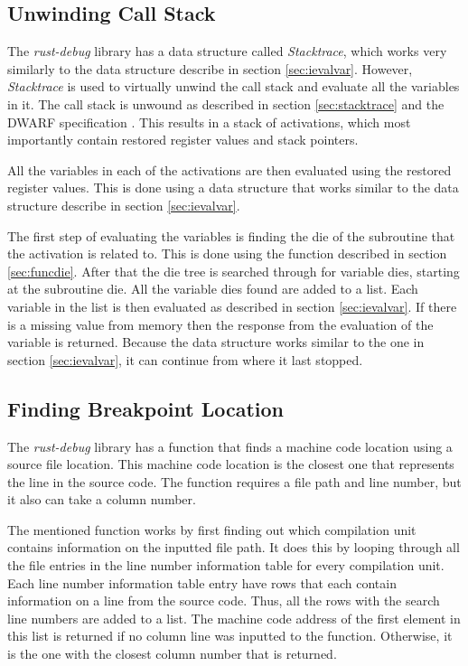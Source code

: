 \subsection{Unwinding Call Stack}
The \emph{rust-debug} library has a data structure called \emph{Stacktrace}, which works very similarly to the data structure describe in section \ref{sec:ievalvar}.
However, \emph{Stacktrace} is used to virtually unwind the call stack and evaluate all the variables in it.
The call stack is unwound as described in section \ref{sec:stacktrace} and the \gls{DWARF} specification \cite{dwarf}.
This results in a stack of activations, which most importantly contain restored register values and stack pointers.


All the variables in each of the activations are then evaluated using the restored register values.
This is done using a data structure that works similar to the data structure describe in section \ref{sec:ievalvar}.

The first step of evaluating the variables is finding the \gls{die} of the subroutine that the activation is related to.
This is done using the function described in section \ref{sec:funcdie}.
After that the \gls{die} tree is searched through for variable \glspl{die}, starting at the subroutine \gls{die}.
All the variable \glspl{die} found are added to a list.
Each variable in the list is then evaluated as described in section \ref{sec:ievalvar}.
If there is a missing value from memory then the response from the evaluation of the variable is returned.
Because the data structure works similar to the one in section \ref{sec:ievalvar}, it can continue from where it last stopped.


\subsection{Finding Breakpoint Location}
The \emph{rust-debug} library has a function that finds a machine code location using a source file location.
This machine code location is the closest one that represents the line in the source code.
The function requires a file path and line number, but it also can take a column number.


The mentioned function works by first finding out which compilation unit contains information on the inputted file path.
It does this by looping through all the file entries in the line number information table for every compilation unit.
Each line number information table entry have rows that each contain information on a line from the source code.
Thus, all the rows with the search line numbers are added to a list.
The machine code address of the first element in this list is returned if no column line was inputted to the function.
Otherwise, it is the one with the closest column number that is returned.




